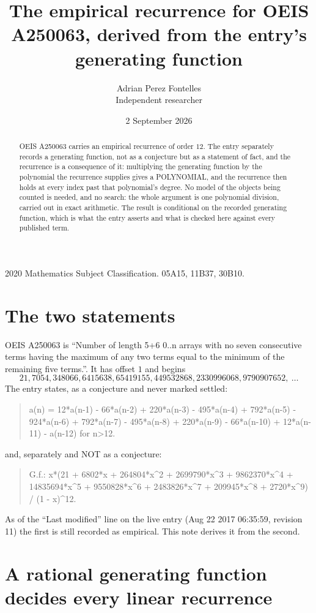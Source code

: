 \documentclass[11pt,a4paper]{article}
\title{The empirical recurrence for OEIS A250063, derived from the entry's generating function}
\author{Adrian Perez Fontelles\\ \small Independent researcher}
\date{2 September 2026}
\theoremstyle{plain}
\theoremstyle{definition}
\begin{document}
\maketitle

\begin{abstract}
OEIS A250063 carries an empirical recurrence of order $12$. The entry separately records a
generating function, not as a conjecture but as a statement of fact, and the recurrence is a
consequence of it: multiplying the generating function by the polynomial the recurrence
supplies gives a POLYNOMIAL, and the recurrence then holds at every index past that
polynomial's degree. No model of the objects being counted is needed, and no search: the
whole argument is one polynomial division, carried out in exact arithmetic. The result is
conditional on the recorded generating function, which is what the entry asserts and what is
checked here against every published term.
\end{abstract}

\noindent\small 2020 Mathematics Subject Classification. 05A15, 11B37, 30B10.\normalsize

\section{The two statements}

OEIS A250063 is ``Number of length 5+6 0..n arrays with no seven consecutive terms having the maximum of any two terms equal to the minimum of the remaining five terms.''. It has offset $1$ and begins
\[
21, 7054, 348066, 6415638, 65419155, 449532868, 2330996068, 9790907652,\ \dots
\]
The entry states, as a conjecture and never marked settled:
\begin{quote}
a(n) = 12*a(n-1) - 66*a(n-2) + 220*a(n-3) - 495*a(n-4) + 792*a(n-5) - 924*a(n-6) + 792*a(n-7) - 495*a(n-8) + 220*a(n-9) - 66*a(n-10) + 12*a(n-11) - a(n-12) for n>12.
\end{quote}
and, separately and NOT as a conjecture:
\begin{quote}
G.f.: x*(21 + 6802*x + 264804*x\^{}2 + 2699790*x\^{}3 + 9862370*x\^{}4 + 14835694*x\^{}5 + 9550828*x\^{}6 + 2483826*x\^{}7 + 209945*x\^{}8 + 2720*x\^{}9) / (1 - x)\^{}12.
\end{quote}
As of the ``Last modified'' line on the live entry (Aug 22 2017 06:35:59, revision 11) the first is still
recorded as empirical. This note derives it from the second.

\section{A rational generating function decides every linear recurrence}
\end{document}
